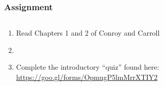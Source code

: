 \documentclass[color=usenames,dvipsnames]{beamer}
\begin{document}
\begin{frame}
  \frametitle{Assignment}
  \begin{columns}
    \begin{column}{0.6\textwidth}
      \large
      \begin{enumerate}[\bf (1)]
        \item<1-> Read Chapters 1 and 2 of Conroy and Carroll
        \item[]
        \item<1-> Complete the introductory ``quiz'' found here: \\ \tiny \url{https://goo.gl/forms/OpmugP5lmMrrXTIY2}
      \end{enumerate}
    \end{column}
    \begin{column}{0.4\textwidth}
    \end{column}
  \end{columns}
\end{frame}
\end{document}
